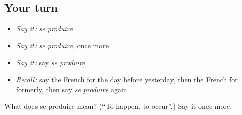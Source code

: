 \subsection*{Your turn}
\begin{itemize}
\raggedright
  \item \emph{Say it:} \emph{se produire}
  \item \emph{Say it:} \emph{se produire}, once more
  \item \emph{Say it:} say \emph{se produire}
  \item \emph{Recall:} say the French for the day before yesterday, then the French for formerly, then say \emph{se produire} again
\end{itemize}

\begin{tcolorbox}[breakable,colback=teal!4,colframe=teal!35!black,title={Before you move on}]
What does se produire mean? (\textquotedblleft{}To happen, to occur\textquotedblright{}.) Say it once more.
\end{tcolorbox}
